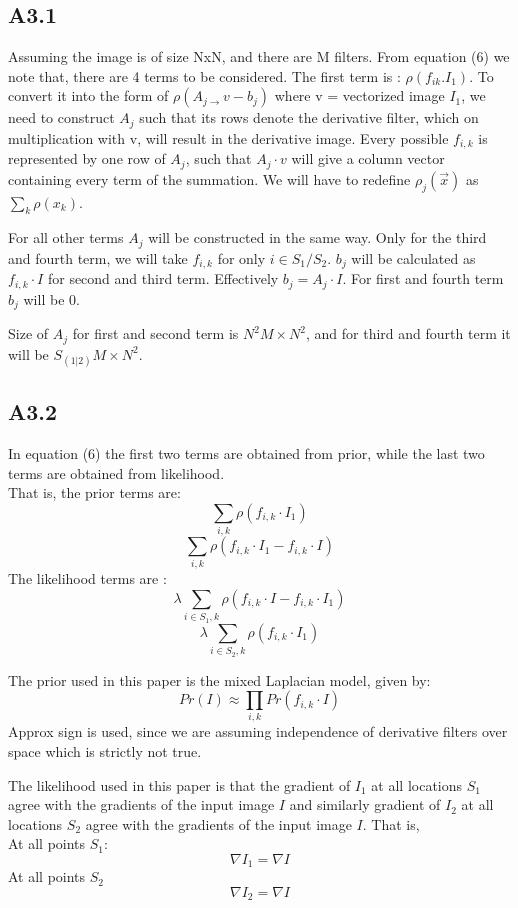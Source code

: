 \documentclass{article}
\begin{document}
\subsection*{A3.1}
Assuming the image is of size NxN, and there are M filters. From equation (6) we note that, there are 4 terms to be considered.
The first term is : $\rho(f_{ik}.I_1)$.
To convert it into the form of $\rho(A_{j\rightarrow}v - b_j)$ where v = vectorized image $I_1$,
we need to construct $A_j$ such that its rows denote the derivative filter,
which on multiplication with v, will result in the derivative image.
Every possible $f_{i,k}$ is represented by one row of $A_j$,
such that $A_j\cdot v$ will give a column vector containing every term of the summation.
We will have to redefine $\rho_j(\vec{x})$ as $\sum_k \rho(x_k)$.


For all other terms $A_j$ will be constructed in the same way.
Only for the third and fourth term, we will take $f_{i,k}$ for only $i\in S_1/S_2$.
$b_j$ will be calculated as $f_{i,k}\cdot I$ for second and third term. Effectively $b_j = A_j\cdot I$.
For first and fourth term $b_j$ will be $0$.

Size of $A_j$ for first and second term is $N^2M\times N^2$, and for third and fourth term it will be $S_{(1|2)}M\times N^2$.

\subsection*{A3.2}
In equation (6) the first two terms are obtained from prior, while the last two terms are obtained from likelihood.\\
That is, the prior terms are:
$$\sum_{i,k} \rho (f_{i,k}\cdot I_1)$$
$$\sum_{i,k} \rho(f_{i,k} \cdot I_1 - f_{i,k} \cdot I)$$
The likelihood terms are :
$$\lambda \sum_{i \in S_1,k} \rho(f_{i,k}\cdot I - f_{i,k}\cdot I_1)$$
$$\lambda \sum_{i \in S_2,k} \rho(f_{i,k}\cdot I_1)$$

The prior used in this paper is the mixed Laplacian model, given by:
$$Pr(I) \approx \prod_{i,k}Pr(f_{i,k} \cdot I)$$
Approx sign is used, since we are assuming independence of derivative filters over space which is strictly not true.

The likelihood used in this paper is that the gradient of $I_1$ at all locations $S_1$ agree with the gradients of the input image $I$
and similarly gradient of $I_2$ at all locations $S_2$ agree with the gradients of the input image $I$. That is,\\
At all points $S_1$:
$$\nabla I_1 = \nabla I$$
At all points $S_2$
$$\nabla I_2 = \nabla I$$
\end{document}
